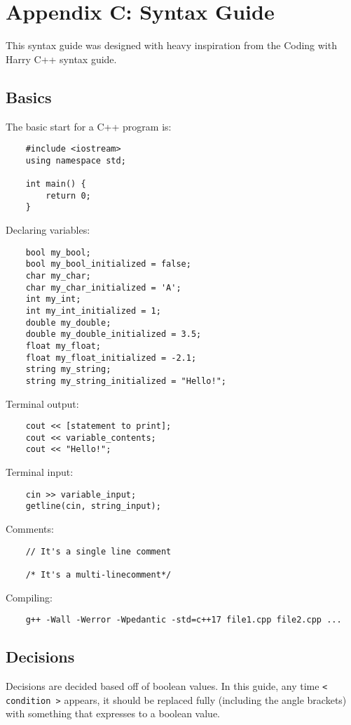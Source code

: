 \chapter*{Appendix C: Syntax Guide}
\setcounter{chapter}{18}
\setcounter{section}{0}

This syntax guide was designed with heavy inspiration from the Coding with Harry C++ syntax guide.

\section{Basics}

The basic start for a C++ program is:
\begin{verbatim}
    #include <iostream>
    using namespace std;
    
    int main() {
        return 0;
    }
\end{verbatim}

Declaring variables:
\begin{verbatim}
    bool my_bool;
    bool my_bool_initialized = false;
    char my_char;
    char my_char_initialized = 'A';
    int my_int;
    int my_int_initialized = 1;
    double my_double;
    double my_double_initialized = 3.5;
    float my_float;
    float my_float_initialized = -2.1;
    string my_string;
    string my_string_initialized = "Hello!";
\end{verbatim}

Terminal output:
\begin{verbatim}
    cout << [statement to print];
    cout << variable_contents;
    cout << "Hello!";
\end{verbatim}

Terminal input:
\begin{verbatim}
    cin >> variable_input;
    getline(cin, string_input);
\end{verbatim}

Comments:
\begin{verbatim}
    // It's a single line comment
    
    /* It's a multi-linecomment*/
\end{verbatim}

Compiling:
\begin{verbatim}
    g++ -Wall -Werror -Wpedantic -std=c++17 file1.cpp file2.cpp ...
\end{verbatim}

\section{Decisions}
Decisions are decided based off of boolean values. In this guide, any time \texttt{< condition >} appears, it should be replaced fully (including the angle brackets) with something that expresses to a boolean value. 

